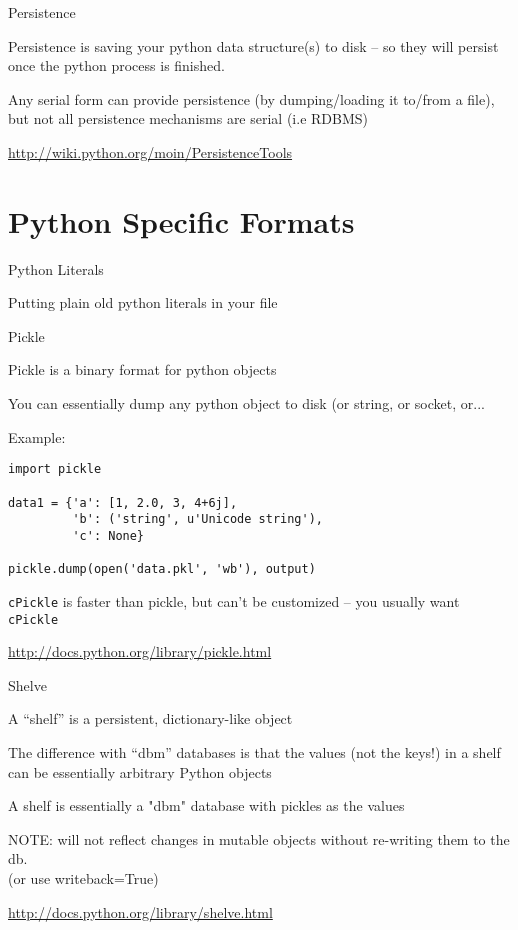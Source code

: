 \documentclass{beamer}
\begin{document}
\begin{frame}[fragile]{Persistence}

\vfill
{\Large Persistence is saving your python data structure(s) to disk -- so they
will persist once the python process is finished.}

\vfill
{\Large Any serial form can provide persistence (by dumping/loading it to/from
a file), but not all persistence mechanisms are serial (i.e RDBMS)}


\vfill
\url{http://wiki.python.org/moin/PersistenceTools}
\end{frame} 


\section{Python Specific Formats}

\begin{frame}[fragile]{Python Literals}

\vfill
{\Large Putting plain old python literals in your file}

\end{frame} 

\begin{frame}[fragile]{Pickle}

\vfill
{\Large Pickle is a binary format for python objects}

\vfill
{\Large You can essentially dump any python object to disk (or string, or socket, or...}

Example:
\begin{verbatim}
import pickle

data1 = {'a': [1, 2.0, 3, 4+6j],
         'b': ('string', u'Unicode string'),
         'c': None}

pickle.dump(open('data.pkl', 'wb'), output)
\end{verbatim}

{\Large \verb|cPickle| is faster than pickle, but
can't be customized -- you usually want \verb|cPickle|} 

\url{http://docs.python.org/library/pickle.html}
\end{frame} 

\begin{frame}[fragile]{Shelve}

\vfill
{\Large A “shelf” is a persistent, dictionary-like object}

\vfill
{\Large The difference with “dbm” databases is that the values (not the keys!)
in a shelf can be essentially arbitrary Python objects}

\vfill
{\Large A shelf is essentially a "dbm" database with pickles as the values}

\vfill
{\Large NOTE: will not reflect changes in mutable objects without
   re-writing them to the db.}\\
   (or use writeback=True)

\vfill
\url{http://docs.python.org/library/shelve.html}
\end{frame} 
\end{document}
